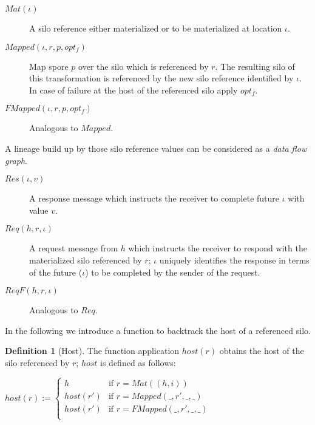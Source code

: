 \documentclass{article}
\theoremstyle{definition}
\newtheorem{defn}{Definition}[section]
\begin{document}
\begin{description}
\item[$Mat(\iota)$] A silo reference either materialized or to be materialized at location $\iota$.

\item[$Mapped(\iota, r, p, opt_f)$] Map spore $p$ over the silo which is referenced by $r$. The resulting silo of this transformation is referenced by the new silo reference identified by $\iota$. In case of failure at the host of the referenced silo apply $opt_f$.  

%

\item[$FMapped(\iota, r, p, opt_f)$] Analogous to $Mapped$.
\end{description}

A lineage build up by those silo reference values can be considered as a {\emph{data flow graph}}\cite{???}. %

\begin{description}
\item[$Res(\iota, v)$] A response message which instructs the receiver to complete future $\iota$ with value $v$.

\item[$Req(h, r, \iota)$] A request message from $h$ which instructs the receiver to respond with the materialized silo referenced by $r$; $\iota$ uniquely identifies the response in terms of the future ($\iota$) to be completed by the sender of the request.

\item[$ReqF(h, r, \iota)$] Analogous to $Req$.
\end{description}

In the following we introduce a function to backtrack the host of a referenced silo.

\begin{defn}[Host]
  The function application $host(r)$ obtains the host of the silo referenced by $r$; $host$ is defined as follows:
  
  $host(r) := \begin{cases}
    h        & \text{if } r = Mat((h, i)) \\
    host(r') & \text{if } r = Mapped(\_, r', \_, \_) \\
    host(r') & \text{if } r = FMapped(\_, r', \_, \_) \\
    \end{cases}$
\end{defn}
\end{document}
